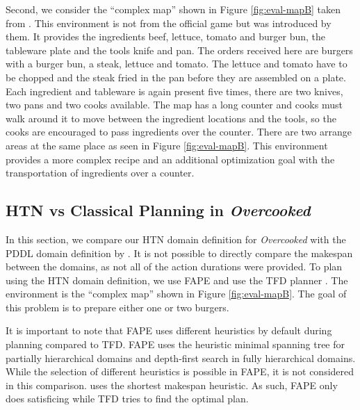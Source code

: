 
Second, we consider the ``complex map'' shown in Figure \ref{fig:eval-mapB} taken from \cite{yuxinliuPlanningOvercookedGame2020}.
This environment is not from the official game but was introduced by them.
It provides the ingredients beef, lettuce, tomato and burger bun, the tableware plate and the tools knife and pan.
The orders received here are burgers with a burger bun, a steak, lettuce and tomato.
The lettuce and tomato have to be chopped and the steak fried in the pan before they are assembled on a plate.
Each ingredient and tableware is again present five times, there are two knives, two pans and two cooks available.
The map has a long counter and cooks must walk around it to move between the ingredient locations and the tools, so the cooks are encouraged to pass ingredients over the counter.
There are two arrange areas at the same place as seen in Figure \ref{fig:eval-mapB}.
This environment provides a more complex recipe and an additional optimization goal with the transportation of ingredients over a counter.

\subsection{HTN vs Classical Planning in \textit{Overcooked}}
\label{sec:evaluation-htn}


In this section, we compare our \ac{HTN} domain definition for \textit{Overcooked} with the \ac{PDDL} domain definition by \cite{yuxinliuPlanningOvercookedGame2020}.
It is not possible to directly compare the makespan between the domains, as not all of the action durations were provided.
To plan using the \ac{HTN} domain definition, we use \ac{FAPE} \citep{bit-monnotTemporalHierarchicalModels2016a} and \cite{yuxinliuPlanningOvercookedGame2020} use the \ac{TFD} planner \citep{eyerichUsingContextenhancedAdditive2009}.
The environment is the ``complex map'' shown in Figure \ref{fig:eval-mapB}.
The goal of this problem is to prepare either one or two burgers.


It is important to note that \ac{FAPE} uses different heuristics by default during planning compared to \ac{TFD}.
\ac{FAPE} uses the heuristic minimal spanning tree for partially hierarchical domains and depth-first search in fully hierarchical domains.
While the selection of different heuristics is possible in \ac{FAPE}, it is not considered in this comparison.
\cite{yuxinliuPlanningOvercookedGame2020} uses the shortest makespan heuristic.
As such, \ac{FAPE} only does satisficing while \ac{TFD} tries to find the optimal plan.

